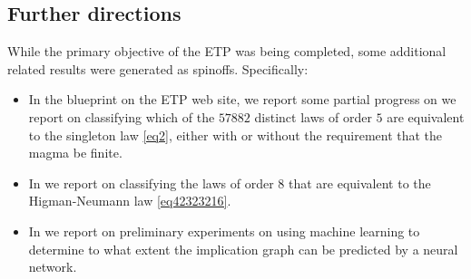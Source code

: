 \subsection{Further directions}

While the primary objective of the ETP was being completed, some additional related results were generated as spinoffs.  Specifically:
\begin{itemize}
\item In the blueprint on the ETP web site, we report some partial progress on we report on classifying which of the $57882$ distinct laws of order $5$ are equivalent to the singleton law \eqref{eq2}, either with or without the requirement that the magma be finite.
\item In  we report on classifying the laws of order $8$ that are equivalent to the Higman-Neumann law \eqref{eq42323216}.
\item In  we report on preliminary experiments on using machine learning to determine to what extent the implication graph can be predicted by a neural network.
\end{itemize}
